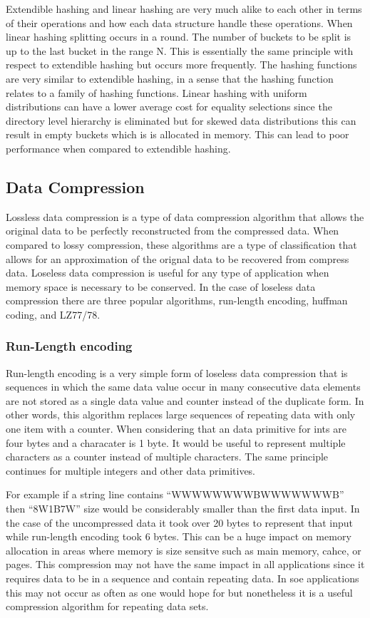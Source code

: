 \documentclass[letterpaper, 12pt]{article}
\begin{document}
Extendible hashing and linear hashing are very much alike to each other in terms of their operations and 
how each data structure handle these operations. When linear hashing splitting occurs in a round. The 
number of buckets to be split is up to the last bucket in the range N. This is essentially the same 
principle with respect to extendible hashing but occurs more frequently. The hashing functions are 
very similar to extendible hashing, in a sense that the hashing function relates to a family of 
hashing functions. Linear hashing with uniform distributions can have a lower average cost for 
equality selections since the directory level hierarchy is eliminated but for skewed data 
distributions this can result in empty buckets which is is allocated in memory. This can lead 
to poor performance when compared to extendible hashing.

\subsection{Data Compression}
Lossless data compression is a type of data compression algorithm that allows
the original data to be perfectly reconstructed from the compressed data. When
compared to lossy compression, these algorithms are a type of classification that
allows for an approximation of the orignal data to be recovered from compress data.
Loseless data compression is useful for any type of application when memory space is
necessary to be conserved. In the case of loseless data compression there are three
popular algorithms, run-length encoding, huffman coding, and LZ77/78.
\par\vspace{\baselineskip}

\subsubsection{Run-Length encoding}
Run-length encoding is a very simple form of loseless data compression that is sequences
in which the same data value occur in many consecutive data elements are not stored as a
single data value and counter instead of the duplicate form. In other words, this algorithm
replaces large sequences of repeating data with only one item with a counter. When considering
that an data primitive for ints are four bytes and a characater is 1 byte. It would be useful
to represent multiple characters as a counter instead of multiple characters. The same principle
continues for multiple integers and other data primitives.
\par\vspace{\baselineskip}
For example if a string line contains ``WWWWWWWWBWWWWWWWB'' then ``8W1B7W'' size would be considerably
smaller than the first data input. In the case of the uncompressed data it took over 20 bytes to
represent that input while run-length encoding took 6 bytes. This can be a huge impact on memory
allocation in areas where memory is size sensitve such as main memory, cahce, or pages.
This compression may not have the same impact in all applications since it requires data to be
in a sequence and contain repeating data. In soe applications this may not occur as often as one would
hope for but nonetheless it is a useful compression algorithm for repeating data sets.
\end{document}
